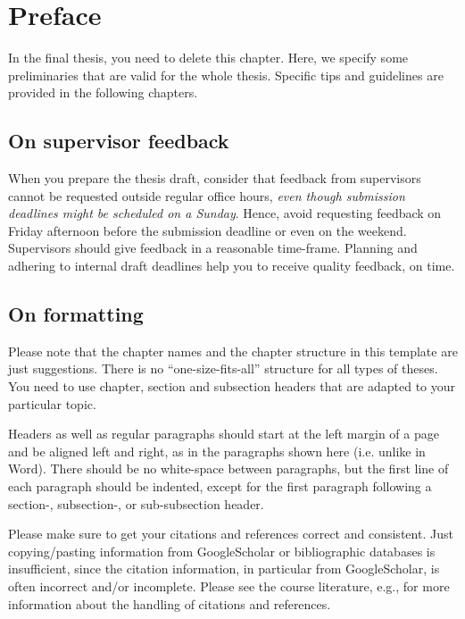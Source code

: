 \chapter{Preface}
In the final thesis, you need to delete this chapter. Here, we specify some preliminaries that are valid for the whole thesis. Specific tips and guidelines are provided in the following chapters. 

\section{On supervisor feedback}
When you prepare the thesis draft, consider that feedback from supervisors cannot be requested outside regular office hours, \emph{even though submission deadlines might be scheduled on a Sunday}. Hence, avoid requesting feedback on Friday afternoon before the submission deadline or even on the weekend. Supervisors should give feedback in a reasonable time-frame. Planning and adhering to internal draft deadlines help you to receive quality feedback, on time.

\section{On formatting}
Please note that the chapter names and the chapter structure in this template are
just suggestions. There is no ``one-size-fits-all'' structure for all types of theses.
You need to use chapter, section and subsection headers that are adapted to your
particular topic.

Headers as well as regular paragraphs should start at the left margin of a page and
be aligned left and right, as in the paragraphs shown here (i.e. unlike in Word).
There should be no white-space between paragraphs, but the first line of each
paragraph should be indented, except for the first paragraph following a section-,
subsection-, or sub-subsection header.

Please make sure to get your citations and references correct and consistent.
Just copying/pasting information from GoogleScholar or bibliographic databases is insufficient,
since the citation information, in particular from GoogleScholar, is often incorrect and/or incomplete.
Please see the course literature, e.g., \cite{berndtsson2007thesis,evans2014write,glasman2010science,zobel2014writing}
for more information about the handling of citations and references.

